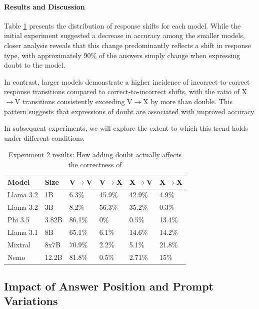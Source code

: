 \paragraph{Results and Discussion}

Table \ref{tab:accuracy_deep_dive} presents the distribution of response shifts for each model. While the initial experiment suggested a decrease in accuracy among the smaller models, closer analysis reveals that this change predominantly reflects a shift in response type, with approximately 90\% of the answers simply change when expressing doubt to the model.

In contrast, larger models demonstrate a higher incidence of incorrect-to-correct response transitions compared to correct-to-incorrect shifts, with the ratio of X$\rightarrow$V transitions consistently exceeding V$\rightarrow$X by more than double. This pattern suggests that expressions of doubt are associated with improved accuracy.

In subsequent experiments, we will explore the extent to which this trend holds under different conditions.

\begin{table}[ht]
  \centering
  \small %
  \begin{tabular}{|l|l|l|l|l|l|}
    \hline
    \textbf{Model} & \textbf{Size} & \textbf{V$\rightarrow$V} & \textbf{V$\rightarrow$X} & \textbf{X$\rightarrow$V} & \textbf{X$\rightarrow$X} \\
    \hline
    Llama 3.2 & 1B  & 6.3\% & 45.9\% & 42.9\% & 4.9\%\\
    Llama 3.2 & 3B & 8.2\% & 56.3\% & 35.2\% & 0.3\%\\
    Phi 3.5 & 3.82B & 86.1\% & 0\% & 0.5\% & 13.4\%\\
    Llama 3.1 & 8B & 65.1\% & 6.1\% & 14.6\% & 14.2\% \\
    Mixtral & 8x7B &70.9\% & 2.2\% & 5.1\% & 21.8\% \\
    Nemo & 12.2B & 81.8\% & 0.5\% & 2.71\% & 15\%\\
    \hline
  \end{tabular}
  \caption{Experiment 2 results: How adding doubt actually affects the correctness of}
  \label{tab:accuracy_deep_dive}
\end{table}

\subsection{Impact of Answer Position and Prompt Variations}

